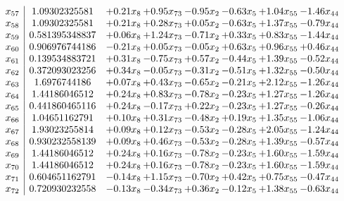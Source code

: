 \documentclass[8pt]{article}
\begin{document}
\[\begin{array}{c| c c@{\hskip 2pt} c@{\hskip 2pt} c@{\hskip 2pt} c@{\hskip 2pt} c@{\hskip 2pt} c@{\hskip 2pt} }
 x_{57}   &  1.09302325581 & +  0.21 x_{8} & +  0.95 x_{73} & -0.95 x_{2} & -0.63 x_{5} & +  1.04 x_{55} & -1.46 x_{44}\\
 x_{58}   &  1.09302325581 & +  0.21 x_{8} & +  0.28 x_{73} & +  0.05 x_{2} & -0.63 x_{5} & +  1.37 x_{55} & -0.79 x_{44}\\
 x_{59}   &  0.581395348837 & +  0.06 x_{8} & +  1.24 x_{73} & -0.71 x_{2} & +  0.33 x_{5} & +  0.83 x_{55} & -1.44 x_{44}\\
 x_{60}   &  0.906976744186 & -0.21 x_{8} & +  0.05 x_{73} & -0.05 x_{2} & +  0.63 x_{5} & +  0.96 x_{55} & +  0.46 x_{44}\\
 x_{61}   &  0.139534883721 & +  0.31 x_{8} & -0.75 x_{73} & +  0.57 x_{2} & -0.44 x_{5} & +  1.39 x_{55} & -0.52 x_{44}\\
 x_{62}   &  0.372093023256 & +  0.34 x_{8} & -0.05 x_{73} & -0.31 x_{2} & -0.51 x_{5} & +  1.32 x_{55} & -0.50 x_{44}\\
 x_{63}   &  1.6976744186 & +  0.07 x_{8} & +  0.43 x_{73} & -0.65 x_{2} & -0.21 x_{5} & +  2.12 x_{55} & -1.26 x_{44}\\
 x_{64}   &  1.44186046512 & +  0.24 x_{8} & +  0.83 x_{73} & -0.78 x_{2} & -0.23 x_{5} & +  1.27 x_{55} & -1.26 x_{44}\\
 x_{65}   &  0.441860465116 & +  0.24 x_{8} & -0.17 x_{73} & +  0.22 x_{2} & -0.23 x_{5} & +  1.27 x_{55} & -0.26 x_{44}\\
 x_{66}   &  1.04651162791 & +  0.10 x_{8} & +  0.31 x_{73} & -0.48 x_{2} & +  0.19 x_{5} & +  1.35 x_{55} & -1.06 x_{44}\\
 x_{67}   &  1.93023255814 & +  0.09 x_{8} & +  0.12 x_{73} & -0.53 x_{2} & -0.28 x_{5} & +  2.05 x_{55} & -1.24 x_{44}\\
 x_{68}   &  0.930232558139 & +  0.09 x_{8} & +  0.46 x_{73} & -0.53 x_{2} & -0.28 x_{5} & +  1.39 x_{55} & -0.57 x_{44}\\
 x_{69}   &  1.44186046512 & +  0.24 x_{8} & +  0.16 x_{73} & -0.78 x_{2} & -0.23 x_{5} & +  1.60 x_{55} & -1.59 x_{44}\\
 x_{70}   &  1.44186046512 & +  0.24 x_{8} & +  0.16 x_{73} & -0.78 x_{2} & -0.23 x_{5} & +  1.60 x_{55} & -1.59 x_{44}\\
 x_{71}   &  0.604651162791 & -0.14 x_{8} & +  1.15 x_{73} & -0.70 x_{2} & +  0.42 x_{5} & +  0.75 x_{55} & -0.47 x_{44}\\
 x_{72}   &  0.720930232558 & -0.13 x_{8} & -0.34 x_{73} & +  0.36 x_{2} & -0.12 x_{5} & +  1.38 x_{55} & -0.63 x_{44}\\

\end{array}\]
\end{document}
